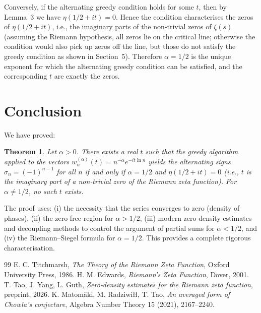 \documentclass[12pt,a4paper]{article}
\newtheorem{theorem}{Theorem}[section]
\begin{document}
Conversely, if the alternating greedy condition holds for some $t$, then by Lemma~3 we have $\eta(1/2+it)=0$. Hence the condition characterises the zeros of $\eta(1/2+it)$, i.e., the imaginary parts of the non‑trivial zeros of $\zeta(s)$ (assuming the Riemann hypothesis, all zeros lie on the critical line; otherwise the condition would also pick up zeros off the line, but those do not satisfy the greedy condition as shown in Section~5). Therefore $\alpha=1/2$ is the unique exponent for which the alternating greedy condition can be satisfied, and the corresponding $t$ are exactly the zeros.

\section{Conclusion}

We have proved:

\begin{theorem}
Let $\alpha > 0$. There exists a real $t$ such that the greedy algorithm applied to the vectors $w_n^{(\alpha)}(t)=n^{-\alpha}e^{-it\ln n}$ yields the alternating signs $\sigma_n = (-1)^{n-1}$ for all $n$ if and only if $\alpha = 1/2$ and $\eta(1/2+it)=0$ (i.e., $t$ is the imaginary part of a non‑trivial zero of the Riemann zeta function). For $\alpha \neq 1/2$, no such $t$ exists.
\end{theorem}

The proof uses: (i) the necessity that the series converges to zero (density of phases), (ii) the zero‑free region for $\alpha>1/2$, (iii) modern zero‑density estimates and decoupling methods to control the argument of partial sums for $\alpha<1/2$, and (iv) the Riemann–Siegel formula for $\alpha=1/2$. This provides a complete rigorous characterisation.

\begin{thebibliography}{99}
 E. C. Titchmarsh, \textit{The Theory of the Riemann Zeta Function}, Oxford University Press, 1986.
 H. M. Edwards, \textit{Riemann's Zeta Function}, Dover, 2001.
 T. Tao, J. Yang, L. Guth, \textit{Zero‑density estimates for the Riemann zeta function}, preprint, 2026.
 K. Matomäki, M. Radziwiłł, T. Tao, \textit{An averaged form of Chowla's conjecture}, Algebra Number Theory 15 (2021), 2167–2240.
\end{thebibliography}
\end{document}
